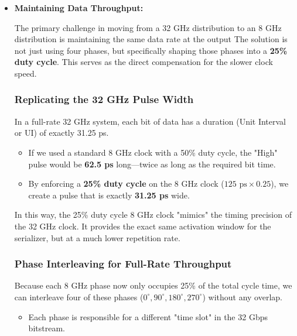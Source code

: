 \documentclass[12pt, a4paper]{report}
\begin{document}
\begin{itemize}
    \item\textbf{Maintaining Data Throughput:}

The primary challenge in moving from a 32 GHz distribution to an 8 GHz distribution is maintaining the same data rate at the output The solution is not just using four phases, but specifically shaping those phases into a \textbf{25\% duty cycle}. This serves as the direct compensation for the slower clock speed.

\subsubsection{Replicating the 32 GHz Pulse Width}
In a full-rate 32 GHz system, each bit of data has a duration (Unit Interval or UI) of exactly 31.25 ps.

\begin{itemize}
    \item If we used a standard 8 GHz clock with a 50\% duty cycle, the "High" pulse would be \textbf{62.5 ps} long—twice as long as the required bit time.
    
    \item By enforcing a \textbf{25\% duty cycle} on the 8 GHz clock (\(125 \text{ ps} \times 0.25\)), we create a pulse that is exactly \textbf{31.25 ps} wide.
\end{itemize}

In this way, the 25\% duty cycle 8 GHz clock "mimics" the timing precision of the 32 GHz clock. It provides the exact same activation window for the serializer, but at a much lower repetition rate.

\subsubsection{Phase Interleaving for Full-Rate Throughput}
Because each 8 GHz phase now only occupies 25\% of the total cycle time, we can interleave four of these phases (\(0^\circ, 90^\circ, 180^\circ, 270^\circ\)) without any overlap.

\begin{itemize}
    \item Each phase is responsible for a different "time slot" in the 32 Gbps bitstream.
    

\end{itemize}
\end{itemize}
\end{document}
